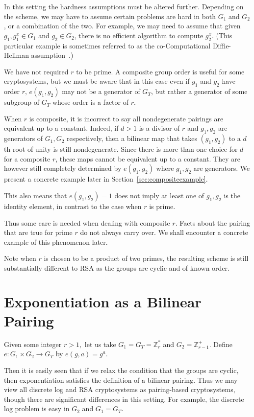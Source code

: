 In this setting the hardness assumptions must be altered further.
Depending on the scheme, we may have to assume certain problems are hard in
both $G_1$ and $G_2$, or a combination of the two. For example, we may
need to assume that given $g_1, g_1^x \in G_1$ and $g_2 \in G_2$,
there is no efficient algorithm to compute $g_2^x$. (This particular
example is sometimes referred to as
the co-Computational Diffie-Hellman assumption~\cite{bls}.)

We have not required $r$ to be prime. A composite group
order is useful for some cryptosystems\cite{bgn},
but we must be aware that in this case even if $g_1$ and $g_2$ have order
$r$, $e(g_1, g_2)$ may not be a generator of $G_T$, but rather a generator
of some subgroup of $G_T$ whose order is a factor of $r$.

When $r$ is composite, it is incorrect to say all nondegenerate pairings are
equivalent up to a constant. Indeed, if $d > 1$ is a divisor of $r$
and $g_1, g_2$ are generators of $G_1, G_2$ respectively, then a bilinear map
that takes $(g_1, g_2)$ to a $d$th root of unity is still nondegenerate.
Since there is more than one choice for $d$ for a composite $r$,
these maps cannot be equivalent up to a constant. They are however still
completely determined by $e(g_1, g_2)$ where $g_1, g_2$ are generators.
We present a concrete example later in Section~\ref{sec:compositeexample}.

This also means that $e(g_1, g_2) = 1$ does not imply at least
one of $g_1, g_2$ is the identity element, in contrast to the case when
$r$ is prime.

Thus some care is needed when dealing with composite $r$.
Facts about the pairing that are true for prime $r$ do not always carry over.
We shall encounter a concrete example of this phenomenon later.

Note when $r$ is chosen to be a product of two primes, the resulting scheme
is still substantially different to RSA as the groups are cyclic and of
known order.

\section{Exponentiation as a Bilinear Pairing}

Given some integer $r > 1,$
let us take $G_1 = G_T = \mathbb{Z}_r^*$ and $G_2 = \mathbb{Z}_{r-1}^+$.
Define $e:G_1\times G_2 \rightarrow G_T$ by $e(g, a)= g^a$.

Then it is easily seen that if we relax the condition that the groups
are cyclic, then exponentiation satisfies the definition of a bilinear pairing.
Thus we may view all discrete log and RSA cryptosystems
as pairing-based cryptosystems, though there are significant differences
in this setting. For example, the discrete log problem is easy
in $G_2$ and $G_1 = G_T$.

